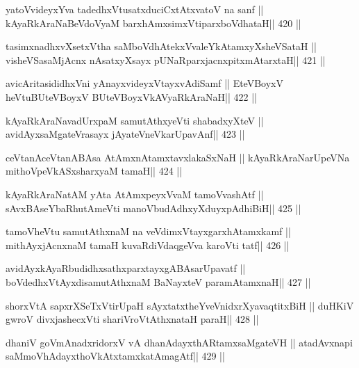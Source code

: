 \begin{shl}
yatoV\s videyxYva tadedhxVtusatxduciCxtAtxvatoV na sanf ||
kAyaRkAraNaBeVdoV\s yaM barxhAmxsimxVtiparxboVdhataH\hfill || 420 ||
\end{shl}

\begin{shl}
tasimxnadhxvXsetxV\s tha saMboVdhAtekxVvaleYkAtamxyXsheVSataH ||
visheVSasaMjAcnx nAsatxyXsayx pUNaRparxjacnxpitxmAtarxtaH\hfill || 421 ||
\end{shl}

\begin{shl}
avicAritasididhxVni yAnayxvideyxVtayxvAdiSamf ||
EteVBoyxV heVtuBUteVBoyxV BUteVBoyxV\s kAVyaRkAraNaH\hfill || 422 ||
\end{shl}

\begin{shl}
kAyaRkAraNavadUrxpaM samutAthxyeVti shabadxyXteV ||
avidAyxsaMgateVrasayx jAyateV\s neVkarUpavAnf\hfill || 423 ||
\end{shl}

\begin{shl}
ceVtanAceVtanABAsa AtAmxnAtamxtavxlakaSxNaH ||
kAyaRkAraNarUpeVNa mithoVpeVkASxsharxyaM tamaH\hfill || 424 ||
\end{shl}

\begin{shl}
kAyaRkAraNatAM yAta AtAmx\s peyxVvaM tamoVvashAtf ||
sAvxBAseYbaRhutAmeVti manoVbudAdhxyXduyxpAdhiBiH\hfill || 425 ||
\end{shl}

\begin{shl}
tamoVheVtu samutAthxnaM na veVdimxVtayxgarxhAtamxkamf ||
mithAyxjAcnxnaM tamaH kuvaRdiVdaqgeVva karoVti tatf\hfill || 426 ||
\end{shl}

\begin{shl}
avidAyxkAyaRbudidhxsathxparxtayxgABAsarUpavatf ||
boVdedhxVtAyxdisamutAthxnaM BaNayxteV paramAtamxnaH\hfill || 427 ||
\end{shl}

\begin{shl}
shorxVtA sapxrXSeTxVtirUpaH sAyxtatxtheYveVnidxrXyavaqtitxBiH ||
duHKiV gwroV divxjashecxVti shariVroVtAthxnataH paraH\hfill || 428 ||
\end{shl}

\begin{shl}
dhaniV goVmAnadxridorxV vA dhanAdayxthARtamxsaMgateVH ||
atadAvxnapi saMmoVhAdayxthoVkAtxtamxkatAmagAtf\hfill || 429 ||
\end{shl}

